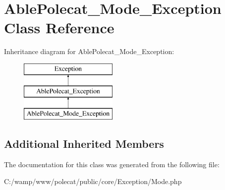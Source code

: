 \hypertarget{class_able_polecat___mode___exception}{}\section{Able\+Polecat\+\_\+\+Mode\+\_\+\+Exception Class Reference}
\label{class_able_polecat___mode___exception}
Inheritance diagram for Able\+Polecat\+\_\+\+Mode\+\_\+\+Exception\+:\begin{figure}[H]
\begin{center}
\leavevmode
\includegraphics[height=3.000000cm]{class_able_polecat___mode___exception}
\end{center}
\end{figure}
\subsection*{Additional Inherited Members}


The documentation for this class was generated from the following file\+:\begin{DoxyCompactItemize}
\item 
C\+:/wamp/www/polecat/public/core/\+Exception/Mode.\+php\end{DoxyCompactItemize}
